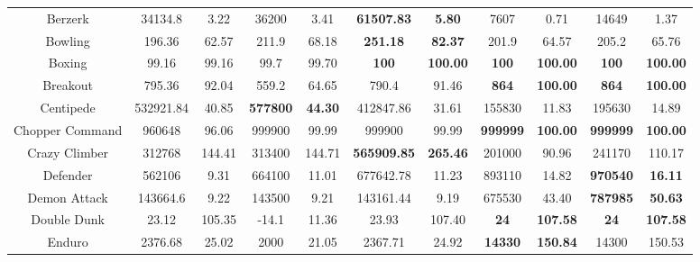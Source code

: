 \documentclass[nohyperref]{article}
\newcommand{\best}[1]{\textbf{#1}}
\theoremstyle{plain}
\begin{document}
\begin{table}[!hb]
\begin{center}
\begin{tabular}{|c| c c| c c| c c| c c| c c| }
 Berzerk            & 34134.8           & 3.22        & 36200           & 3.41           & \textbf{61507.83}    &\textbf{5.80 }          &7607              &0.71    &14649             &1.37    \\
 Bowling            & 196.36            & 62.57       & 211.9           & 68.18          & \textbf{251.18}      &\textbf{82.37}          &201.9             &64.57   &205.2             &65.76    \\
 Boxing             & 99.16             & 99.16       & 99.7            & 99.70          & \textbf{100}         &\textbf{100.00}         &\best{100}        &\textbf{100.00} &\textbf{100}       &\textbf{100.00}     \\
 Breakout           & 795.36            & 92.04       & 559.2           & 64.65          & 790.4                &91.46          &\best{864}        &\textbf{100.00}  &\textbf{864}             &\textbf{100.00}    \\
 Centipede          & 532921.84         & 40.85       & \textbf{577800} & \textbf{44.30}          & 412847.86            &31.61          &155830            &11.83   &195630            &14.89    \\
 Chopper Command    &960648             & 96.06       &999900           & 99.99          &999900                &99.99          &\best{999999}     &\textbf{100.00}  &\textbf{999999}            &\textbf{100.00}    \\
 Crazy Climber      & 312768            & 144.41      & 313400          & 144.71         &\textbf{565909.85}    &\textbf{265.46}         &201000            &90.96   &241170            &110.17    \\
 Defender           & 562106            & 9.31        & 664100          & 11.01          & 677642.78            &11.23          &893110     &14.82   &\textbf{970540}            &\textbf{16.11}    \\
 Demon Attack       & 143664.6          & 9.22        & 143500          & 9.21           & 143161.44            &9.19           &675530     &43.40    &\textbf{787985}   &\textbf{50.63}   \\
 Double Dunk        & 23.12             & 105.35      & -14.1           & 11.36          & 23.93       &107.40         &\textbf{24}                &\textbf{107.58}  &\textbf{24}                &\textbf{107.58}    \\
 Enduro             & 2376.68           & 25.02       & 2000            & 21.05          & 2367.71              &24.92          &\best{14330}      &\textbf{150.84}  &14300             &150.53    \\

\end{tabular}
\end{center}
\end{table}
\end{document}
